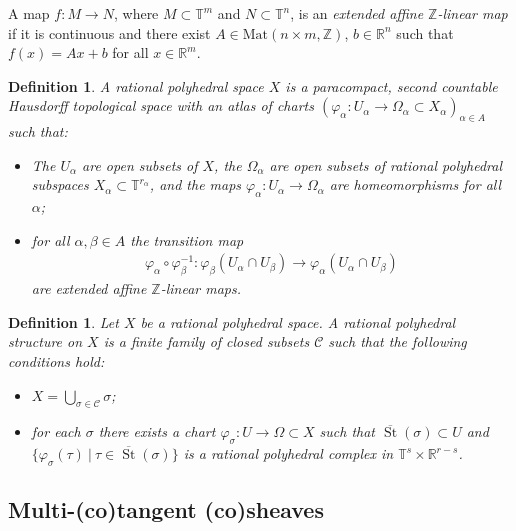 \documentclass[11pt]{article}
\numberwithin{equation}{numsection}
\newcommand{\Z}{{\mathbb Z}}
\newcommand{\CC}{{\mathcal C}}
\newcommand{\R}{{\mathbb R}}
\newcommand{\T}{{\mathbb T}}
\DeclareMathOperator{\St}{St}
\newtheorem{defn}[thm]{Definition}
\begin{document}
A map $f \colon M \to N$, where  $M \subset \T^m$ and $N \subset \T^n$, is an
\emph{extended affine $\Z$-linear map} if it is continuous 
and there exist $A \in \text{Mat}(n \times m, \Z)$,
$b \in \R^n$ such that $f(x) = Ax +b$ for all $x \in \R^m$.


\begin{defn}
\label{def:polyhedralspace}
A \emph{rational polyhedral space} $X$ is a paracompact, second countable Hausdorff topological space with an atlas of charts 
$(\varphi_{\alpha} \colon U_{\alpha} \rightarrow \Omega_{\alpha} \subset X_{\alpha})_{{\alpha} \in A}$ such that:
\begin{itemize}
\item[\rm (1)]
The $U_{\alpha}$ are open subsets of $X$, the $\Omega_{\alpha}$ are open subsets of rational polyhedral subspaces 
$X_{\alpha} \subset \T^{r_{\alpha}}$, and the maps 
$\varphi_{\alpha} \colon U_{\alpha} \rightarrow \Omega_{\alpha}$ are homeomorphisms for all $\alpha$; 
\item[\rm (2)]
for all $\alpha, \beta \in A$ the transition map
\begin{align*}
\varphi_{\alpha}\circ \varphi^{-1}_ \beta\colon \varphi_ \beta(U_{\alpha} \cap U_ \beta) \rightarrow {\varphi_\alpha(U_{\alpha} \cap U_ \beta)}
\end{align*}
are  extended affine $\Z$-linear maps.
\end{itemize} 
\end{defn} 

\begin{defn}\label{def:facestructure}
Let $X$ be a rational polyhedral space.
A \emph{rational polyhedral structure}
on $X$ is a finite family of closed subsets $\CC$ such that the following conditions hold:
\begin{itemize}
\item[\rm (1)]
$X = \bigcup_{\sigma \in \CC} \sigma$;
\item[\rm (2)]
for each $\sigma$ there exists a chart $\varphi_\sigma \colon U \rightarrow \Omega \subset X$
such that $\overline{\St}(\sigma) \subset U$ and $\{\varphi_\sigma(\tau) \ | \ \tau \in \overline{\St}(\sigma)\}$ is a rational polyhedral complex
in $\T^s \times \R^{r-s}$.
\end{itemize}
\end{defn}




\subsection{Multi-(co)tangent (co)sheaves} 
\end{document}
